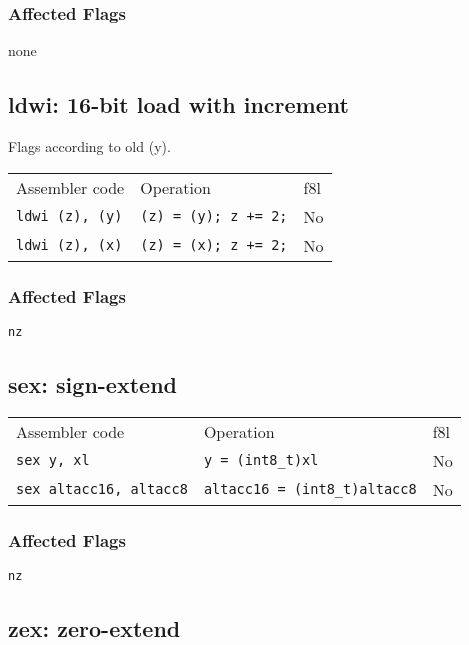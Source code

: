 \documentclass{book}
\begin{document}
\subsubsection*{Affected Flags}

none


\subsection{ldwi: 16-bit load with increment}

Flags according to old (y).

\begin{tabular}{l l l}
Assembler code         & Operation                   & f8l \\
\texttt{ldwi (z), (y)} & \texttt{(z) = (y); z += 2;} & No \\
\texttt{ldwi (z), (x)} & \texttt{(z) = (x); z += 2;} & No \\
\end{tabular}

\subsubsection*{Affected Flags}

\texttt{nz}


\subsection{sex: sign-extend}

\begin{tabular}{l l l}
Assembler code                 & Operation                            & f8l \\
\texttt{sex y, xl}             & \texttt{y = (int8\_t)xl}             & No \\
\texttt{sex altacc16, altacc8} & \texttt{altacc16 = (int8\_t)altacc8} & No \\
\end{tabular}

\subsubsection*{Affected Flags}

\texttt{nz}


\subsection{zex: zero-extend}
\end{document}
